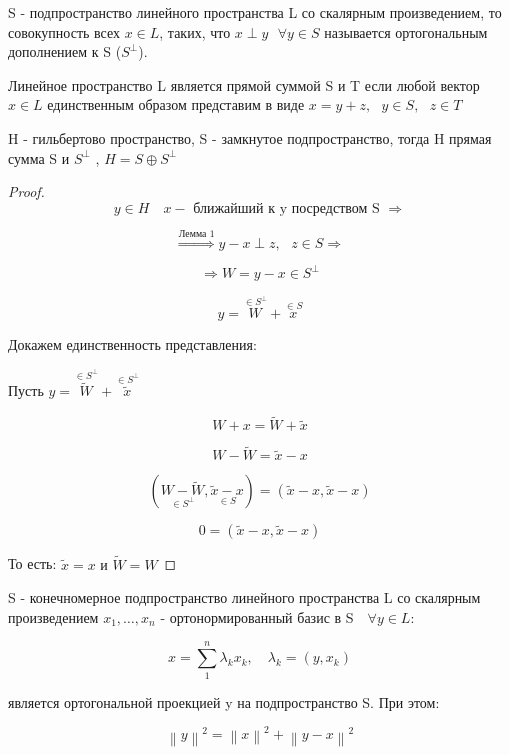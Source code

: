 \documentclass[12pt, a4paper]{report}
\begin{document}
\begin{definition}
    S - подпространство линейного пространства L  со скалярным произведением, то совокупность всех \( x \in  L    \), таких, что \( x \perp y \text{ }  \forall  y \in S  \) называется ортогональным дополнением к S  (\( S^{\perp }  \)).
\end{definition}

\begin{definition}
    Линейное пространство L является прямой суммой S  и T если любой вектор \( x \in  L      \)  единственным образом представим в виде \( x = y + z , \text{ }  y \in  S , \text{  } z \in  T  \) 
\end{definition}

\begin{lemma}
    H - гильбертово пространство, S - замкнутое подпространство, тогда H  прямая сумма S  и \(  S^{\perp } \) , \( H =   S \oplus S^{\perp }   \) 
\end{lemma}

\begin{proof}
    
    \[  y \in  H \quad  x - \text{ ближайший к y посредством S } \Rightarrow  \] 

    \[ \overset{\text{Лемма 1} }{\Rightarrow} y -x \perp  z , \text{ }  z \in  S \Rightarrow  \] 

    \[\Rightarrow  W = y -x \in  S^{\perp }  \]  

    \[ y = \overset{ \in  S ^{\perp } }{W} +\overset{\in  S }{ x}  \] 

    Докажем единственность представления: 

    Пусть \( y = \overset{ \in  S ^{\perp } }{\tilde{W }} + \overset{ \in  S ^{\perp } }{\tilde{ x }}  \) 

    \[  W + x = \tilde{ W } +\tilde{ x } \] 

    \[ W - \tilde{W } = \tilde{ x } - x  \] 

    \[ (\underset{\in  S ^{\perp }}{W- \tilde{W }}  , \underset{\in S}{ \tilde{ x } - x }) = (\tilde{x } -x , \tilde{x } - x ) \] 

    \[ 0 =  (\tilde{x } -x , \tilde{x } - x )\] 

    То есть: \( \tilde{x } = x  \text{ и }  \tilde{W } = W  \) 
\end{proof}

\begin{theorem}
    S - конечномерное подпространство линейного пространства L со скалярным произведением \( x_1, \ldots, x_n    \)  - ортонормированный базис в S \( \text{ } \forall  y \in  L     \):

    \[ x = \sum_{1} ^n \lambda_k x_k , \quad  \lambda_k = (y , x_k) \] 

    является ортогональной проекцией y на подпространство S. При этом: 

    \[  \left\lVert  y  \right\rVert ^2 =\left\lVert  x  \right\rVert ^2 + \left\lVert  y -x   \right\rVert ^2  \] 
\end{theorem}
\end{document}

